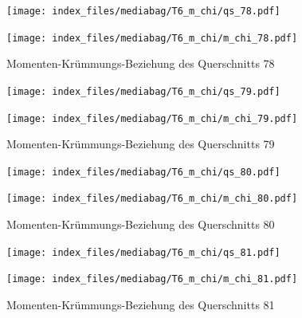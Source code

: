 \documentclass[
  11pt,
  letterpaper,
]{scrreprt}
\begin{document}
\begin{figure}[H]

\begin{minipage}{0.50\linewidth}
\texttt{[image: index\_files/mediabag/T6\_m\_chi/qs\_78.pdf]}\end{minipage}%
%
\begin{minipage}{0.50\linewidth}
\texttt{[image: index\_files/mediabag/T6\_m\_chi/m\_chi\_78.pdf]}\end{minipage}%

\caption{\label{fig-mchi_anhang}Momenten-Krümmungs-Beziehung des
Querschnitts 78}

\end{figure}%

\begin{figure}[H]

\begin{minipage}{0.50\linewidth}
\texttt{[image: index\_files/mediabag/T6\_m\_chi/qs\_79.pdf]}\end{minipage}%
%
\begin{minipage}{0.50\linewidth}
\texttt{[image: index\_files/mediabag/T6\_m\_chi/m\_chi\_79.pdf]}\end{minipage}%

\caption{\label{fig-mchi_anhang}Momenten-Krümmungs-Beziehung des
Querschnitts 79}

\end{figure}%

\begin{figure}[H]

\begin{minipage}{0.50\linewidth}
\texttt{[image: index\_files/mediabag/T6\_m\_chi/qs\_80.pdf]}\end{minipage}%
%
\begin{minipage}{0.50\linewidth}
\texttt{[image: index\_files/mediabag/T6\_m\_chi/m\_chi\_80.pdf]}\end{minipage}%

\caption{\label{fig-mchi_anhang}Momenten-Krümmungs-Beziehung des
Querschnitts 80}

\end{figure}%

\begin{figure}[H]

\begin{minipage}{0.50\linewidth}
\texttt{[image: index\_files/mediabag/T6\_m\_chi/qs\_81.pdf]}\end{minipage}%
%
\begin{minipage}{0.50\linewidth}
\texttt{[image: index\_files/mediabag/T6\_m\_chi/m\_chi\_81.pdf]}\end{minipage}%

\caption{\label{fig-mchi_anhang}Momenten-Krümmungs-Beziehung des
Querschnitts 81}

\end{figure}%
\end{document}
